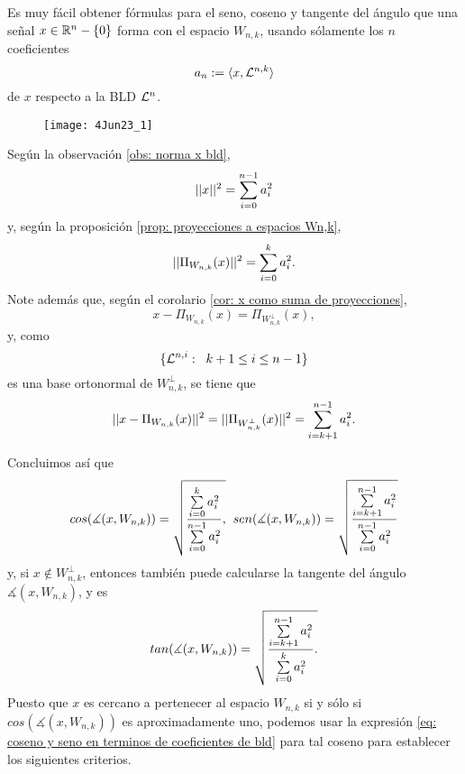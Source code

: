 Es muy fácil obtener fórmulas para el seno, coseno y tangente
del ángulo que una señal $x \in \mathbb{R}^{n}-\{ 0 \}$ forma con
el espacio
$W_{n,k}$, usando sólamente los $n$ coeficientes
\[
a_{n} := \langle x, \mathcal{L}^{n,k} \rangle
\]
de $x$ respecto a la BLD $\mathcal{L}^{n}$.

\begin{figure}[H]
	\centering
	\texttt{[image: 4Jun23\_1]} 
\end{figure}	
Según la observación \ref{obs: norma x bld}, 
\[
||x||^{2} = \sum\limits_{i=0}^{n-1}a_{i}^{2}
\]
y, según la proposición \ref{prop: proyecciones a espacios Wn,k}, 
\[
||\Pi_{W_{n, k}}(x)||^{2} = \sum\limits_{i=0}^{k}a_{i}^{2}.
\]
Note además que, según el corolario \ref{cor: x como suma de proyecciones},
\[
x - \Pi_{W_{n,k}}(x) = \Pi_{W_{n,k}^{\perp}}(x),
\]
y, como
\[
\{ \mathcal{L}^{n, i}: \hspace{0.2cm} k+1 \leq i \leq n-1 \}
\]
es una base ortonormal de
$W_{n, k}^{\perp}$, se tiene que 
\[
||x - \Pi_{W_{n,k}}(x)||^{2} = 
||\Pi_{W_{n,k}^{\perp}}(x)||^{2} = 
\sum\limits_{i=k+1}^{n-1}a_{i}^{2}.
\]

Concluimos así que
\begin{equation}
\label{eq: coseno y seno en terminos de coeficientes de bld}
cos(\measuredangle(x, W_{n, k}))
= \sqrt{
\frac{
\sum\limits_{i=0}^{k}a_{i}^{2}
}{
\sum\limits_{i=0}^{n-1}a_{i}^{2} },
}
\hspace{0.2cm}
sen(\measuredangle(x, W_{n, k}))
= \sqrt{
\frac{
\sum\limits_{i=k+1}^{n-1}a_{i}^{2}
}{
\sum\limits_{i=0}^{n-1}a_{i}^{2}}
}
\end{equation}
y, si $x \not\in W_{n, k}^{\perp}$, entonces
también puede calcularse la tangente del ángulo 
$\measuredangle(x, W_{n, k})$, y es
\[
tan(\measuredangle(x, W_{n, k}))
= \sqrt{
\frac{
\sum\limits_{i=k+1}^{n-1}a_{i}^{2}
}{
\sum\limits_{i=0}^{k}a_{i}^{2}}.
}
\]
Puesto que $x$ es cercano a pertenecer al espacio
$W_{n,k}$ si y sólo si 
$cos(\measuredangle(x, W_{n, k}))$ es aproximadamente uno,
podemos usar la expresión 
\eqref{eq: coseno y seno en terminos de coeficientes de bld} para
tal coseno para establecer los siguientes criterios.

